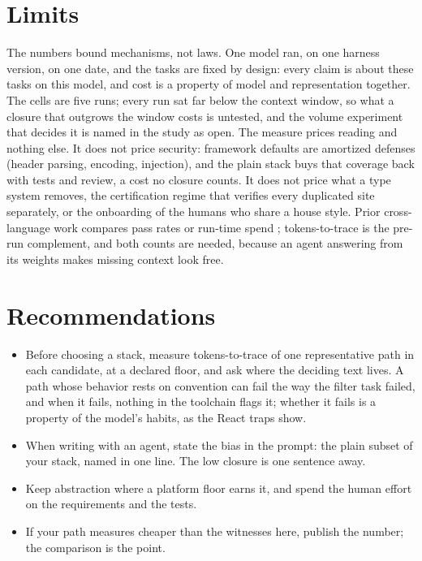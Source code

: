 \documentclass[journal]{IEEEtran}
\begin{document}
\section*{Limits}

The numbers bound mechanisms, not laws. One model ran, on one harness
version, on one date, and the tasks are fixed by design: every claim is
about these tasks on this model, and cost is a property of model and
representation together. The cells are five runs; every run
sat far below the context window, so what a closure that outgrows the
window costs is untested, and the volume experiment that decides it is named
in the study as open. The measure prices reading and nothing else. It does not
price security: framework defaults are amortized defenses (header
parsing, encoding, injection), and the plain stack buys that coverage
back with tests and review, a cost no closure counts. It does not price
what a type system removes, the certification regime that verifies
every duplicated site separately, or the onboarding of the humans who
share a house style. Prior cross-language work compares pass rates or
run-time spend \cite{multiple,swebench}; tokens-to-trace is the pre-run
complement, and both counts are needed, because an agent answering from
its weights makes missing context look free.

\section*{Recommendations}

\begin{itemize}[nosep]
\item Before choosing a stack, measure tokens-to-trace of one
representative path in each candidate, at a declared floor, and ask
where the deciding text lives. A path whose behavior rests on
convention can fail the way the filter task failed, and when it fails,
nothing in the toolchain flags it; whether it fails is a property of
the model's habits, as the React traps show.
\item When writing with an agent, state the bias in the prompt: the
plain subset of your stack, named in one line. The low closure is one
sentence away.
\item Keep abstraction where a platform floor earns it, and spend the
human effort on the requirements and the tests.
\item If your path measures cheaper than the witnesses here, publish
the number; the comparison is the point.
\end{itemize}
\end{document}
